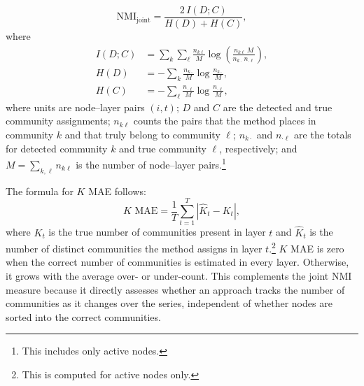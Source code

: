 \documentclass[11pt, letterpaper]{article}
\begin{document}
\begin{equation}
\mathrm{NMI}_{\text{joint}}
  = \frac{2\, I(D;C)}{H(D) + H(C)},
\end{equation}
where
\begin{align}
I(D;C) &= \sum_{k}\sum_{\ell} \frac{n_{k\ell}}{M}
          \log\!\left(\frac{n_{k\ell}\, M}{n_{k\cdot}\, n_{\cdot \ell}}\right), \\[4pt]
H(D)   &= -\sum_{k} \frac{n_{k\cdot}}{M} \log\frac{n_{k\cdot}}{M}, \\[4pt]
H(C)   &= -\sum_{\ell} \frac{n_{\cdot \ell}}{M} \log\frac{n_{\cdot \ell}}{M},
\end{align}
where units are node--layer pairs $(i,t)$; $D$ and $C$ are the detected and true community assignments; $n_{k\ell}$ counts the pairs that the method places in community $k$ and that truly belong to community $\ell$; $n_{k\cdot}$ and $n_{\cdot \ell}$ are the totals for detected community $k$ and true community $\ell$, respectively; and $M = \sum_{k,\ell} n_{k\ell}$ is the number of node--layer pairs.\footnote{This includes only active nodes.}

The formula for $K$ MAE follows:
\begin{equation}
K\text{ MAE} = \frac{1}{T} \sum_{t=1}^{T} \left| \hat{K}_t - K_t \right|,
\end{equation}
where $K_t$ is the true number of communities present in layer $t$ and $\hat{K}_t$ is the number of distinct communities the method assigns in
layer $t$.\footnote{This is computed for active nodes only.} $K$ MAE is zero when the correct number of communities is estimated in every layer. Otherwise, it grows with the average over- or under-count. This complements the joint NMI measure because it directly assesses whether an approach tracks the number of communities as it changes over the series, independent of whether nodes are sorted into the correct communities.
\end{document}
